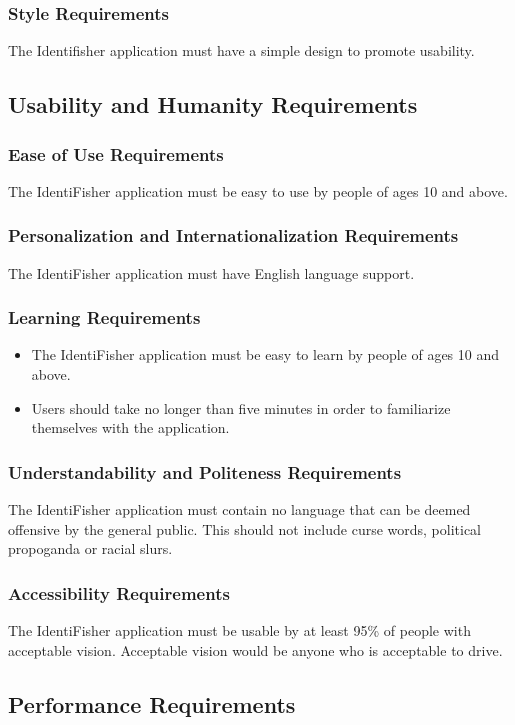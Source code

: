 \documentclass{article}
\begin{document}
\subsubsection{Style Requirements}
The Identifisher application must have a simple design to promote usability.

\subsection{Usability and Humanity Requirements}
\subsubsection{Ease of Use Requirements}
The IdentiFisher application must be easy to use by people of ages 10 and above.
\subsubsection{Personalization and Internationalization Requirements}
The IdentiFisher application must have English language support.
\subsubsection{Learning Requirements}
\begin{itemize}
	\item The IdentiFisher application must be easy to learn by people of ages 10 and above. 
	\item Users should take no longer than five minutes in order to familiarize themselves with the application.
\end{itemize}
\subsubsection{Understandability and Politeness Requirements}
The IdentiFisher application must contain no language that can be deemed offensive by the general public. This should not include curse words, political propoganda or racial slurs.
\subsubsection{Accessibility Requirements}
The IdentiFisher application must be usable by at least 95\% of people with acceptable vision. Acceptable vision would be anyone who is acceptable to drive.
\subsection{Performance Requirements}
\end{document}
